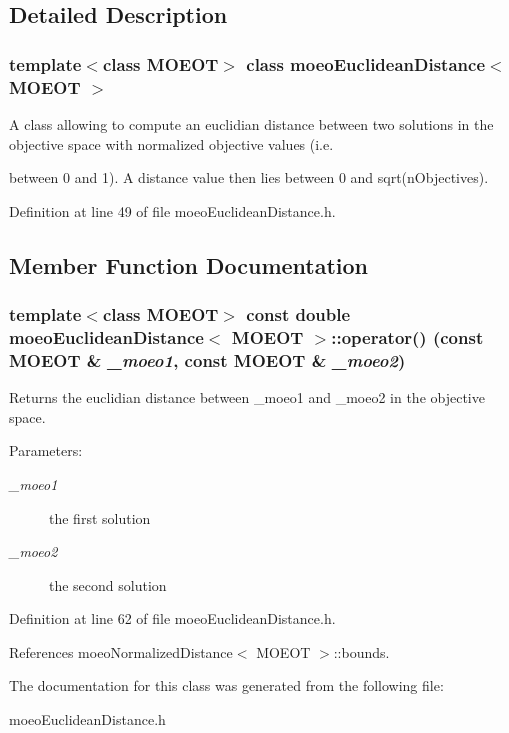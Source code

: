 \subsection{Detailed Description}
\subsubsection*{template$<$class MOEOT$>$ class moeo\-Euclidean\-Distance$<$ MOEOT $>$}

A class allowing to compute an euclidian distance between two solutions in the objective space with normalized objective values (i.e. 

between 0 and 1). A distance value then lies between 0 and sqrt(n\-Objectives). 



Definition at line 49 of file moeo\-Euclidean\-Distance.h.

\subsection{Member Function Documentation}
\subsubsection{\setlength{\rightskip}{0pt plus 5cm}template$<$class MOEOT$>$ const double \bf{moeo\-Euclidean\-Distance}$<$ MOEOT $>$::operator() (const MOEOT \& {\em \_\-moeo1}, const MOEOT \& {\em \_\-moeo2})\hspace{0.3cm}{\tt  [inline]}}\label{classmoeoEuclideanDistance_20ff559e95da92a46990eb0658f018f1}


Returns the euclidian distance between \_\-moeo1 and \_\-moeo2 in the objective space. 

\begin{Desc}
\item[Parameters:]
\begin{description}
\item[{\em \_\-moeo1}]the first solution \item[{\em \_\-moeo2}]the second solution \end{description}
\end{Desc}


Definition at line 62 of file moeo\-Euclidean\-Distance.h.

References moeo\-Normalized\-Distance$<$ MOEOT $>$::bounds.

The documentation for this class was generated from the following file:\begin{CompactItemize}
\item 
moeo\-Euclidean\-Distance.h\end{CompactItemize}
